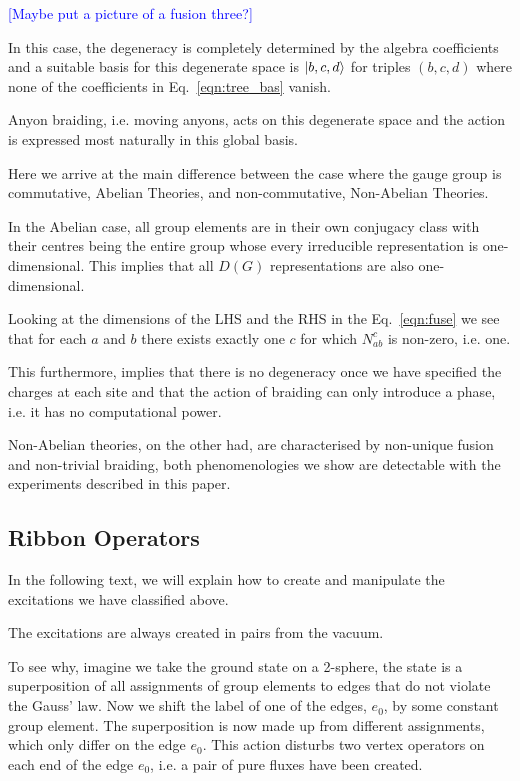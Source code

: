 \documentclass[two column]{article}
\newcommand{\jovan}[1]{\textcolor{blue}{[#1]}}
\begin{document}
\jovan{Maybe put a picture of a fusion three?}

In this case, the degeneracy is completely determined by the algebra coefficients and a suitable basis for this degenerate space is $\ket{b,c,d}$ for triples $(b,c,d)$ where none of the coefficients in Eq.~\eqref{eqn:tree_bas} vanish.

Anyon braiding, i.e. moving anyons, acts on this degenerate space and the action is expressed most naturally in this global basis.

Here we arrive at the main difference between the case where the gauge group is commutative, Abelian Theories, and non-commutative, Non-Abelian Theories.

In the Abelian case, all group elements are in their own conjugacy class with their centres being the entire group whose every irreducible representation is one-dimensional. This implies that all $D(G)$ representations are also one-dimensional. 

Looking at the dimensions of the LHS and the RHS in the Eq.~\eqref{eqn:fuse} we see that for each $a
$ and $b$ there exists exactly one $c$ for which $N_{ab}^c$ is non-zero, i.e. one.

This furthermore, implies that there is no degeneracy once we have specified the charges at each site and that the action of braiding can only introduce a phase, i.e. it has no computational power.

Non-Abelian theories, on the other had, are characterised by non-unique fusion and non-trivial braiding, both phenomenologies we show are detectable with the experiments described in this paper.

\subsection{Ribbon Operators}

In the following text, we will explain how to create and manipulate the excitations we have classified above.

The excitations are always created in pairs from the vacuum. 

To see why, imagine we take the ground state on a 2-sphere, the state is a superposition of all assignments of group elements to edges that do not violate the Gauss' law. Now we shift the label of one of the edges, $e_0$, by some constant group element. The superposition is now made up from different assignments, which only differ on the edge $e_0$. This action disturbs two vertex operators on each end of the edge $e_0$, i.e. a pair of pure fluxes have been created.
\end{document}

